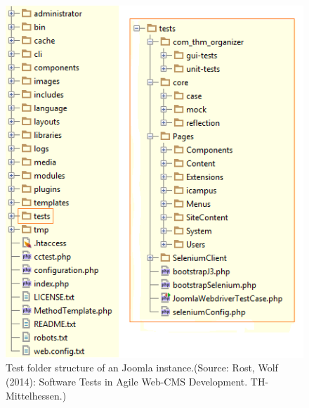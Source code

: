 \begin{figure}
\centering
\includegraphics[scale=0.8]{images/test folder structure in joomla}
\caption[Caption for LOF]{Test folder structure of an Joomla instance.{\footnotesize (Source: Rost, Wolf (2014): Software Tests in Agile Web-CMS Development. TH-Mittelhessen.)}}
\label{test_folder_structure_joomla}
\end{figure}